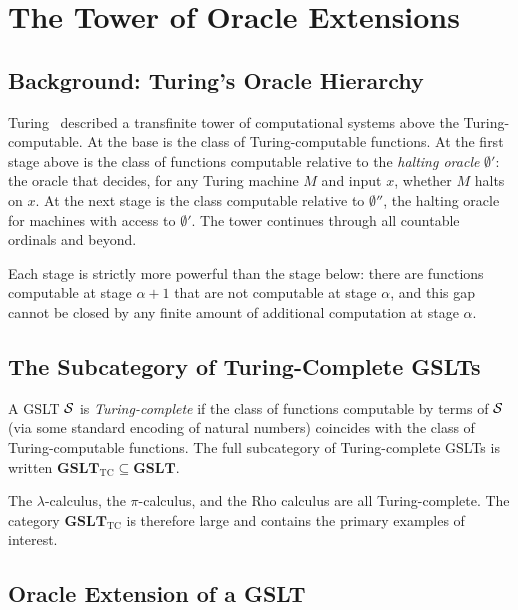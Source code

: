 \chapter{The Tower of Oracle Extensions}
\label{sec:fibration}
\label{ch:tower}

\section{Background: Turing's Oracle Hierarchy}

Turing~\cite{turing1939} described a transfinite tower of
computational systems above the Turing-computable.
At the base is the class of Turing-computable functions.
At the first stage above is the class of functions computable
relative to the \emph{halting oracle} $\emptyset'$: the oracle that
decides, for any Turing machine $M$ and input $x$, whether $M$
halts on $x$.
At the next stage is the class computable relative to
$\emptyset''$, the halting oracle for machines with access to
$\emptyset'$.
The tower continues through all countable ordinals and beyond.

Each stage is strictly more powerful than the stage below:
there are functions computable at stage $\alpha+1$ that are not
computable at stage $\alpha$, and this gap cannot be closed by
any finite amount of additional computation at stage $\alpha$.

\section{The Subcategory of Turing-Complete GSLTs}

\begin{definition}
A GSLT $\mathcal{S}$ is \emph{Turing-complete} if the class of functions
computable by terms of $\mathcal{S}$ (via some standard encoding of
natural numbers) coincides with the class of Turing-computable
functions.
The full subcategory of Turing-complete GSLTs is written
$\mathbf{GSLT}_{\mathrm{TC}} \subseteq \mathbf{GSLT}$.
\end{definition}

\begin{example}
The $\lambda$-calculus, the $\pi$-calculus, and the Rho calculus
are all Turing-complete.
The category $\mathbf{GSLT}_{\mathrm{TC}}$ is therefore large and
contains the primary examples of interest.
\end{example}

\section{Oracle Extension of a GSLT}

